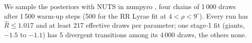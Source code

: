 We sample the posteriors with NUTS \citep{Hoffman2014} in {\sc numpyro} \citep{Phan2019}, four chains of 1\,000 draws after 1\,500 warm-up steps (500 for the RR Lyrae fit at $4<\rho<9^\circ$). Every run has $\hat R\leq1.017$ and at least 217 effective draws per parameter; one stage-1 fit (giants, $-1.5$ to $-1.1$) has 5 divergent transitions among its 4\,000 draws, the others none.
